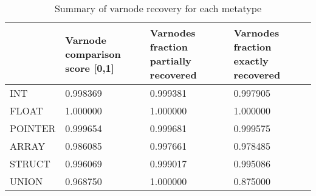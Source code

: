 \begin{table}[t]
\centering
\caption{Summary of varnode recovery for each metatype}
\label{table:metatype-recovery-summary}
\begin{tabular}{lp{6.0cm}p{6.0cm}p{6.0cm}}
\toprule
{} &  Varnode comparison score [0,1] &  Varnodes fraction partially recovered &  Varnodes fraction exactly recovered \\
\midrule
INT     &                        0.998369 &                               0.999381 &                             0.997905 \\
FLOAT   &                        1.000000 &                               1.000000 &                             1.000000 \\
POINTER &                        0.999654 &                               0.999681 &                             0.999575 \\
ARRAY   &                        0.986085 &                               0.997661 &                             0.978485 \\
STRUCT  &                        0.996069 &                               0.999017 &                             0.995086 \\
UNION   &                        0.968750 &                               1.000000 &                             0.875000 \\
\bottomrule
\end{tabular}
\end{table}
